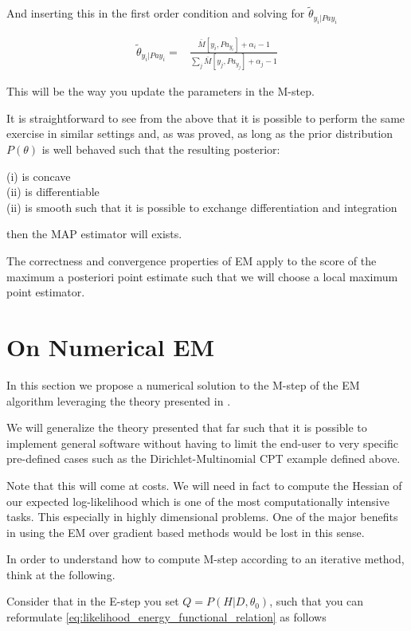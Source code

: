 \documentclass[11pt]{article}
\begin{document}
And inserting this in the first order condition and solving for
\(\tilde{\theta}_{y_i | Pa{y_i}}\)

\begin{align} \label{eq:solution}
\tilde{\theta}_{y_i | Pa{y_i}} =& \frac{\bar{M}[y_i, Pa_{y_i}] + \alpha_i - 1}{\sum_j \bar{M}[y_j, Pa_{y_j}] + \alpha_j - 1}
\end{align}

This will be the way you update the parameters in the M-step.

It is straightforward to see from the above that it is possible to
perform the same exercise in similar settings and, as was proved,
as long as the prior distribution \(P(\theta)\) is well behaved such
that the resulting posterior:

(i) is concave \\
(ii) is differentiable \\
(ii) is smooth such that it is possible to exchange differentiation and integration

then the MAP estimator will exists.

The correctness and convergence properties of EM apply to the score
of the maximum a posteriori point estimate such that we will choose
a local maximum point estimator.

\section{On Numerical EM}
\label{sec:org5924745}

In this section we propose a numerical solution to the M-step of the
EM algorithm leveraging the theory presented in
\cite{ruud1989comparison}.

We will generalize the theory presented that far such that it is
possible to implement general software without having to limit the
end-user to very specific pre-defined cases such as the
Dirichlet-Multinomial CPT example defined above.

Note that this will come at costs. We will need in fact to compute
the Hessian of our expected log-likelihood which is one of the most
computationally intensive tasks. This especially in highly
dimensional problems. One of the major benefits in using the EM over
gradient based methods would be lost in this sense.

In order to understand how to compute M-step according to an
iterative method, think at the following.

Consider that in the E-step you set \(Q = P (H| D, \theta_0)\), such
that you can reformulate
\ref{eq:likelihood_energy_functional_relation} as follows
\end{document}
